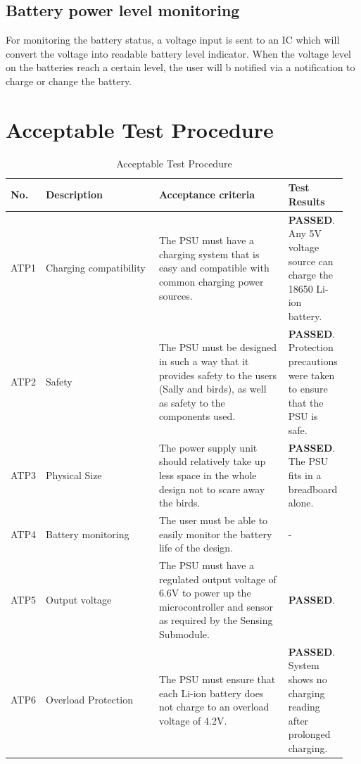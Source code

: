 \documentclass[class=report,11pt,crop=false]{standalone}
\begin{document}
	
	\subsection{Battery power level monitoring}
	For monitoring the battery status, a voltage input is sent to an IC which will convert the voltage into readable battery level indicator. When the voltage level on the batteries reach a certain level, the user will b notified via a notification to charge or change the battery.  
	
	\section{Acceptable Test Procedure}
	\begin{table}[h!]
		\centering
		\caption{Acceptable Test Procedure}
		\label{tab:P3}
		\begin{tabularx}{0.9\textwidth}{|>{\centering\arraybackslash}m{0.05\linewidth}|>{\centering\arraybackslash}m{0.35\linewidth}|>{\centering\arraybackslash}m{0.4\linewidth}|>{\centering\arraybackslash}m{0.15\linewidth}|}
			\hline
			\textbf{No.} & \textbf{Description} & \textbf{Acceptance criteria} & \textbf{Test Results} \\
			\hline
			ATP1 & Charging compatibility & The PSU must have a charging system that is easy and compatible with common charging power sources. & \textbf{PASSED}. Any 5V voltage source can charge the 18650 Li-ion battery. \\
			\hline
			ATP2 & Safety & The PSU must be designed in such a way that it provides safety to the users (Sally and birds), as well as safety to the components used. & \textbf{PASSED}. Protection precautions were taken to ensure that the PSU is safe. \\
			\hline
			ATP3 & Physical Size & The power supply unit should relatively take up less space in the whole design not to scare away the birds. & \textbf{PASSED}. The PSU fits in a breadboard alone. \\
			\hline
			ATP4 & Battery monitoring & The user must be able to easily monitor the battery life of the design. & - \\
			\hline
			ATP5 & Output voltage & The PSU must have a regulated output voltage of 6.6V to power up the microcontroller and sensor as required by the Sensing Submodule. & \textbf{PASSED}. \\
			\hline
			ATP6 & Overload Protection & The PSU must ensure that each Li-ion battery does not charge to an overload voltage of 4.2V. & \textbf{PASSED}. System shows no charging reading after prolonged charging. \\

\end{tabularx}
\end{table}
\end{document}
